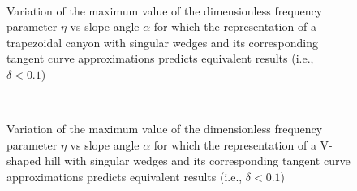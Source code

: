 \documentclass[11pt,letterpaper]{article}
\begin{document}
\begin{figure}[H]
	\centering
	\
	\hspace{-.25cm}
	\\
	\caption{Variation of the maximum value of the dimensionless frequency parameter $\eta$ vs slope angle $\alpha$ for which the representation of a trapezoidal canyon with singular wedges and its corresponding tangent curve approximations predicts equivalent results (i.e., $\delta < 0.1$)}
	\label{fig:deltaLDTSyn}
\end{figure}


\begin{figure}[H]
	\centering
	\
	\hspace{-.25cm}
	\\
	\caption{Variation of the maximum value of the dimensionless frequency parameter $\eta$ vs slope angle $\alpha$ for which the representation of a V-shaped hill with singular wedges and its corresponding tangent curve approximations predicts equivalent results (i.e., $\delta < 0.1$)}
	\label{fig:deltaLDVSyn2}
\end{figure}
\end{document}
